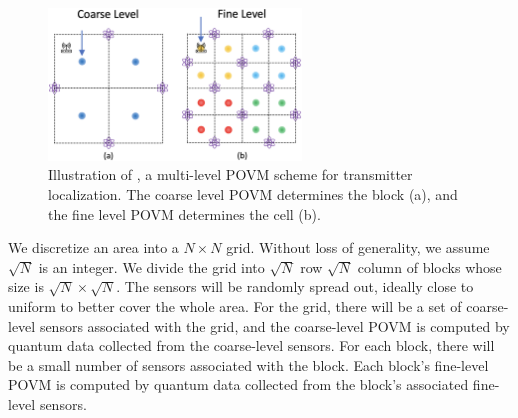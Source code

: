 \begin{figure}
    \centering
    \includegraphics[width=0.6\textwidth]{chapters/icc/figures/povm-loc.png}
    \caption{Illustration of \povm, a multi-level POVM scheme for transmitter localization. The coarse level POVM determines the block (a), and the fine level POVM determines the cell (b).}
    \label{fig:povm-loc}
\end{figure}

We discretize an area into a $N\times N$ grid.
Without loss of generality, we assume $\sqrt{N}$ is an integer.
We divide the grid into $\sqrt{N}$ row $\sqrt{N}$ column of blocks whose size is $\sqrt{N}\times\sqrt{N}$.
The sensors will be randomly spread out, ideally close to uniform to better cover the whole area.
For the grid, there will be a set of coarse-level sensors associated with the grid, and the coarse-level POVM is computed by quantum data collected from the coarse-level sensors.
For each block, there will be a small number of sensors associated with the block. 
Each block's fine-level POVM is computed by quantum data collected from the block's associated fine-level sensors.


